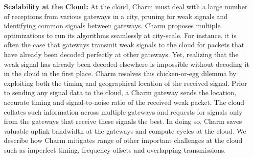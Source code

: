 
\noindent \textbf{Scalability at the Cloud:} At the cloud, Charm must deal
with a large number of receptions from various gateways in a city, pruning for
weak signals and identifying common signals between gateways. Charm proposes
multiple optimizations to run its algorithms seamlessly at city-scale. For
instance, it is often the case that gateways transmit weak signals to the
cloud for packets that have already been decoded perfectly at other gateways.
Yet, realizing that the weak signal has already been decoded elsewhere is
impossible without decoding it in the cloud in the first place. Charm resolves
this chicken-or-egg dilemma by exploiting both the timing and geographical
location of the received signal. Prior to sending any signal data to the
cloud, a Charm gateway sends the location, accurate timing and signal-to-noise
ratio of the received weak packet. The cloud collates such information across
multiple gateways and requests for signals only from the gateways that receive
these signals the best. In doing so, Charm saves valuable uplink bandwidth at
the gateways and compute cycles at the cloud. We describe how Charm mitigates
range of other important challenges at the cloud such as imperfect timing,
frequency offsets and overlapping transmissions.




